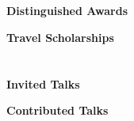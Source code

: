 \documentclass[margin,line,pifont,palatino,courier]{res}
\begin{document}
\begin{resume}
\section{} 
\begin{description}

\item \textbf{Distinguished Awards}
\Fields{\Who\What\ForWhat\Where\When}


\vspace{10pt}

\item \textbf{Travel Scholarships}
\Fields{\Who\What\ForWhat\Where\When}


\end{description}
 
 
 
 
\section{} 
\begin{description}

\item \textbf{Invited Talks}

\Fields{\Title\Date\Where\Address\Abslink\Conflink}

\vspace{10pt}
\item \textbf{Contributed Talks}


\end{description}
\end{resume}
\end{document}
